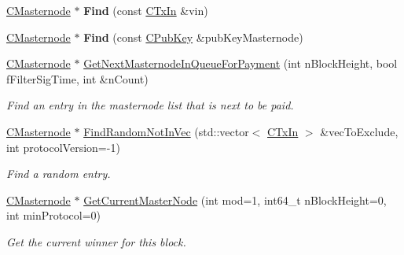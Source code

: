 \begin{DoxyCompactItemize}
\mbox{\label{class_c_masternode_man_aade63e2fbea916e7051819015ef31dc5}} 
\mbox{\hyperlink{class_c_masternode}{C\+Masternode}} $\ast$ {\bfseries Find} (const \mbox{\hyperlink{class_c_tx_in}{C\+Tx\+In}} \&vin)
\item 
\mbox{\label{class_c_masternode_man_a2dddce0ba7602d92e5a7b18e28147d3c}} 
\mbox{\hyperlink{class_c_masternode}{C\+Masternode}} $\ast$ {\bfseries Find} (const \mbox{\hyperlink{class_c_pub_key}{C\+Pub\+Key}} \&pub\+Key\+Masternode)
\item 
\mbox{\label{class_c_masternode_man_af90f3376d7f264536207b08e2fc395d8}} 
\mbox{\hyperlink{class_c_masternode}{C\+Masternode}} $\ast$ \mbox{\hyperlink{class_c_masternode_man_af90f3376d7f264536207b08e2fc395d8}{Get\+Next\+Masternode\+In\+Queue\+For\+Payment}} (int n\+Block\+Height, bool f\+Filter\+Sig\+Time, int \&n\+Count)
\begin{DoxyCompactList}\small\item\em Find an entry in the masternode list that is next to be paid. \end{DoxyCompactList}\item 
\mbox{\label{class_c_masternode_man_abfe90ee0fb23e6ff54b7801f6ddf4155}} 
\mbox{\hyperlink{class_c_masternode}{C\+Masternode}} $\ast$ \mbox{\hyperlink{class_c_masternode_man_abfe90ee0fb23e6ff54b7801f6ddf4155}{Find\+Random\+Not\+In\+Vec}} (std\+::vector$<$ \mbox{\hyperlink{class_c_tx_in}{C\+Tx\+In}} $>$ \&vec\+To\+Exclude, int protocol\+Version=-\/1)
\begin{DoxyCompactList}\small\item\em Find a random entry. \end{DoxyCompactList}\item 
\mbox{\label{class_c_masternode_man_a2b3a91870855e8fcb9b2b6e00c35197f}} 
\mbox{\hyperlink{class_c_masternode}{C\+Masternode}} $\ast$ \mbox{\hyperlink{class_c_masternode_man_a2b3a91870855e8fcb9b2b6e00c35197f}{Get\+Current\+Master\+Node}} (int mod=1, int64\+\_\+t n\+Block\+Height=0, int min\+Protocol=0)
\begin{DoxyCompactList}\small\item\em Get the current winner for this block. \end{DoxyCompactList}\item 

\end{DoxyCompactItemize}
